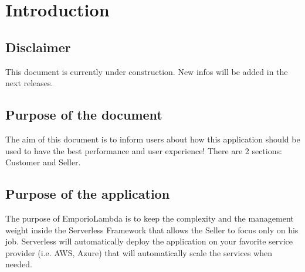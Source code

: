 \section{Introduction} \label{_introduction}
\subsection{Disclaimer}
This document is currently under construction. New infos will be added in the next releases.

\subsection{Purpose of the document}
The aim of this document is to inform users about how this application should be used to have the best performance and user experience! There are 2 sections: Customer and Seller.

\subsection{Purpose of the application}
The purpose of EmporioLambda is to keep the complexity and the management weight inside the Serverless Framework that allows the Seller to focus only on his job. Serverless will automatically deploy the application on your favorite service provider (i.e. AWS, Azure) that will automatically scale the services when needed.